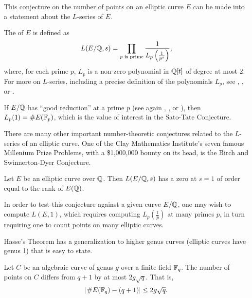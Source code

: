 This conjecture on the number of points on an elliptic curve $E$
can be made into a statement about the $L$-series of $E$.
\begin{comment}
The $L$-series of curves are central to many conjectures in number theory.
A complete discussion of $L$-series is outside the scope of this thesis;
we present only enough to motivate the topic of this thesis.
Let $E$ be an elliptic curve defined over the rational numbers $\bb Q$,
meaning $E$ is defined by a polynomial in $\bb Q[x,y]$ of the form of Equation \ref{eq_elliptic}.
\end{comment}
The  of $E$ is defined as
\[ L(E/\mathbb{Q}, s)  = \prod_{p \text{ is prime}} \frac 1 {L_p \left( \frac 1 {p^s} \right)},\]
where, for each prime $p$, $L_p$ is a non-zero polynomial in $\mathbb{Q}[t]$ of degree at most 2.
For more on $L$-series, including a precise definition of the polynomials $L_p$,
see \cite{husemoller87}, \cite{milne06}, or \cite{silverman09}.

If $E/\mathbb{Q}$ has ``good reduction'' at a prime $p$
(see again \cite{husemoller87}, \cite{milne06}, or \cite{silverman09}),
then $L_p(1) = \#E(\mathbb{F}_p)$, which is the value of interest in the Sato-Tate Conjecture.

There are many other important number-theoretic conjectures related to the $L$-series of an elliptic curve.
One of the Clay Mathematics Institute's seven famous Millenium Prize Problems,
with a \$1,000,000 bounty on its head,
is the Birch and Swinnerton-Dyer Conjecture.

\begin{conjecture}
  Let $E$ be an elliptic curve over $\mathbb{Q}$.
  Then $L(E/\mathbb{Q}, s)$ has a zero at $s = 1$ of order equal to the rank of $E(\mathbb{Q})$.
\end{conjecture}

In order to test this conjecture against a given curve $E/\mathbb{Q}$,
one may wish to compute $L(E, 1)$, which requires computing $L_p(\frac 1 p)$ at many primes $p$,
in turn requiring one to count points on many elliptic curves.

Hasse's Theorem has a generalization to higher genus curves
(elliptic curves have genus 1) that is easy to state.
\begin{theorem}
  Let $C$ be an algebraic curve of genus $g$ over a finite field $\mathbb{F}_q$.
  The number of points on $C$ differs from $q + 1$ by at most $2g \sqrt q$.
  That is,
  \[ | \#E(\mathbb{F}_q) - (q + 1) | \leq 2g \sqrt q. \]
\end{theorem}

